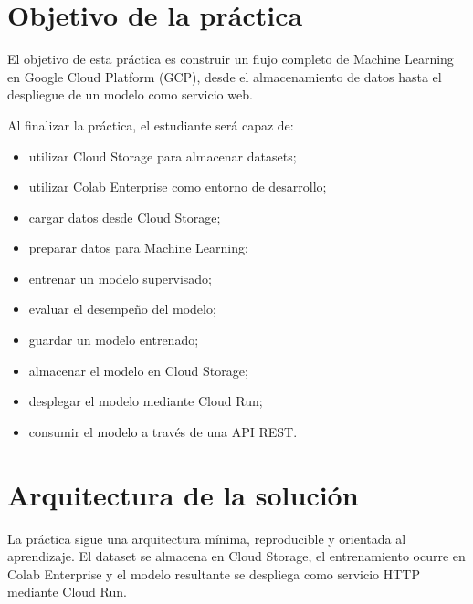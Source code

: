 \documentclass[
  coursetitle={Cómputo Nube y Tecnologías Emergentes},
  coursehours={96},
  coursedate={Verano 2026},
  doctype={Tutorial},
  otherlangs={english,french},
  authorname={Lázaro},
  authorsurname={Bustio-Martínez},
  authortitle={PhD},
  role={Profesor Investigador},
  email={lbustio@inaoe.mx},
  phone={5559504000},
  ext={7459},
  institution={Instituto Nacional de Astrofísica, Óptica y Electrónica (INAOE)},
  department={Maestría en Ciencias en Tecnologías de Seguridad},
  address={Luis Enrique Erro 1, Sta. Ma. Tonantzintla, San Andrés Cholula, CP 72840, Puebla, México},
  margin={0.5in}
]{../../lbustio_lecture_notes}
\begin{document}
\IberoCover


\section{Objetivo de la práctica}

El objetivo de esta práctica es construir un flujo completo de Machine Learning en Google Cloud Platform (GCP), desde el almacenamiento de datos hasta el despliegue de un modelo como servicio web.

Al finalizar la práctica, el estudiante será capaz de:

\begin{itemize}
    \item utilizar Cloud Storage para almacenar datasets;
    \item utilizar Colab Enterprise como entorno de desarrollo;
    \item cargar datos desde Cloud Storage;
    \item preparar datos para Machine Learning;
    \item entrenar un modelo supervisado;
    \item evaluar el desempeño del modelo;
    \item guardar un modelo entrenado;
    \item almacenar el modelo en Cloud Storage;
    \item desplegar el modelo mediante Cloud Run;
    \item consumir el modelo a través de una API REST.
\end{itemize}

\section{Arquitectura de la solución}

La práctica sigue una arquitectura mínima, reproducible y orientada al aprendizaje. El dataset se almacena en Cloud Storage, el entrenamiento ocurre en Colab Enterprise y el modelo resultante se despliega como servicio HTTP mediante Cloud Run.
\end{document}
